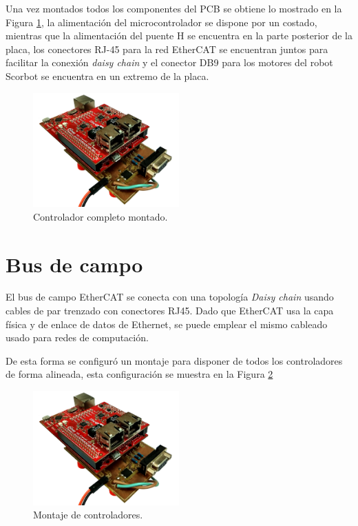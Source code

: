 Una vez montados todos los componentes del PCB se obtiene lo mostrado en la Figura \ref{cap4_controlador_completo}, la alimentación del microcontrolador se dispone por un costado, mientras que la alimentación del puente H se encuentra en la parte posterior de la placa, los conectores RJ-45 para la red EtherCAT se encuentran juntos para facilitar la conexión \textit{daisy chain} y el conector DB9 para los motores del robot Scorbot se encuentra en un extremo de la placa. 

\begin{figure}[H]
  \centering
  \includegraphics[width=0.5\textwidth]{img/cap4/board}
  \caption{Controlador completo montado.}
  \label{cap4_controlador_completo}
\end{figure}

\section{Bus de campo}

El bus de campo EtherCAT se conecta con una topología \textit{Daisy chain} usando cables de par trenzado con conectores RJ45. Dado que EtherCAT usa la capa física y de enlace de datos de Ethernet, se puede emplear el mismo cableado usado para redes de computación.

De esta forma se configuró un montaje para disponer de todos los controladores de forma alineada, esta configuración se muestra en la Figura \ref{cap4_montaje}


\begin{figure}[H]
  \centering
  \includegraphics[width=0.5\textwidth]{img/cap4/board}
  \caption{Montaje de controladores.}
  \label{cap4_montaje}
\end{figure}

